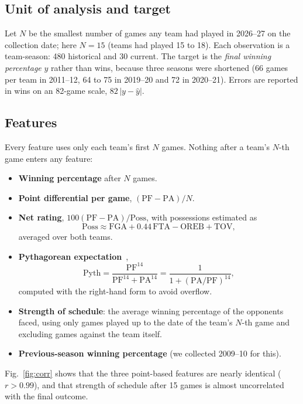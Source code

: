 \documentclass[conference]{IEEEtran}
\begin{document}
\subsection{Unit of analysis and target}
Let $N$ be the smallest number of games any team had played in 2026--27 on the collection date; here $N=15$ (teams had played 15 to 18). Each observation is a team-season: 480 historical and 30 current. The target is the \emph{final winning percentage} $y$ rather than wins, because three seasons were shortened (66 games per team in 2011--12, 64 to 75 in 2019--20 and 72 in 2020--21). Errors are reported in wins on an 82-game scale, $82\,|y-\hat y|$.

\subsection{Features}
Every feature uses only each team's first $N$ games. Nothing after a team's $N$-th game enters any feature:
\begin{itemize}
\item \textbf{Winning percentage} after $N$ games.
\item \textbf{Point differential per game}, $(\mathrm{PF}-\mathrm{PA})/N$.
\item \textbf{Net rating}, $100(\mathrm{PF}-\mathrm{PA})/\mathrm{Poss}$, with possessions estimated as~\cite{kubatko2007}
\begin{equation}
\mathrm{Poss} \approx \mathrm{FGA} + 0.44\,\mathrm{FTA} - \mathrm{OREB} + \mathrm{TOV},
\label{eq:poss}
\end{equation}
averaged over both teams.
\item \textbf{Pythagorean expectation}~\cite{kubatko2007},
\begin{equation}
\mathrm{Pyth} = \frac{\mathrm{PF}^{14}}{\mathrm{PF}^{14}+\mathrm{PA}^{14}} = \frac{1}{1+(\mathrm{PA}/\mathrm{PF})^{14}},
\label{eq:pyth}
\end{equation}
computed with the right-hand form to avoid overflow.
\item \textbf{Strength of schedule}: the average winning percentage of the opponents faced, using only games played up to the date of the team's $N$-th game and excluding games against the team itself.
\item \textbf{Previous-season winning percentage} (we collected 2009--10 for this).
\end{itemize}
Fig.~\ref{fig:corr} shows that the three point-based features are nearly identical ($r>0.99$), and that strength of schedule after 15 games is almost uncorrelated with the final outcome.
\end{document}
